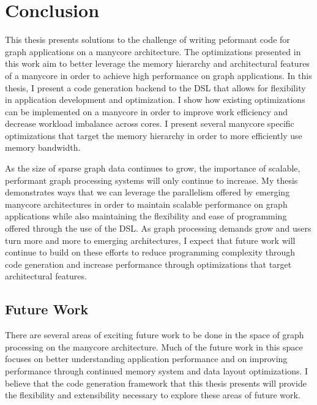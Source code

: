 \chapter{Conclusion}\label{gen:sec:conclusion}

This thesis presents solutions to the challenge of writing peformant code for graph applications on a manycore architecture. 
The optimizations presented in this work aim to better leverage the memory hierarchy and architectural features of a manycore in order to achieve high performance on graph applications. 
In this thesis, I present a code generation backend to the \graphit DSL that allows for flexibility in application development and optimization. 
I show how existing optimizations can be implemented on a manycore in order to improve work efficiency and decrease workload imbalance across cores. 
I present several manycore specific optimizations that target the memory hierarchy in order to more efficiently use memory bandwidth.

As the size of sparse graph data continues to grow, the importance of scalable, performant graph processing systems will only continue to increase. 
My thesis demonstrates ways that we can leverage the parallelism offered by emerging manycore architectures in order to maintain scalable performance on graph applications while also maintaining the flexibility and ease of programming offered through the use of the \graphit DSL. 
As graph processing demands grow and users turn more and more to emerging architectures, I expect that future work will continue to build on these efforts to reduce programming complexity through code generation and increase performance through optimizations that target architectural features. 

\section{Future Work}
There are several areas of exciting future work to be done in the space of graph processing on the \hb manycore architecture. 
Much of the future work in this space focuses on better understanding application performance and on improving performance through continued memory system and data layout optimizations.
I believe that the code generation framework that this thesis presents will provide the flexibility and extensibility necessary to explore these areas of future work.

